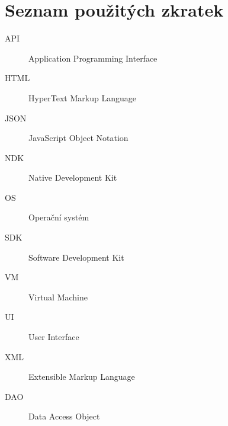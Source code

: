 \documentclass[thesis=B,czech]{FITthesis}[2013/10/20]
\begin{document}



\appendix

\chapter{Seznam použitých zkratek}
\begin{description}
	\item[API] Application Programming Interface
	\item[HTML] HyperText Markup Language
	\item[JSON] JavaScript Object Notation
	\item[NDK] Native Development Kit
	\item[OS] Operační systém
	\item[SDK] Software Development Kit
	\item[VM] Virtual Machine
	\item[UI] User Interface
	\item[XML] Extensible Markup Language
	\item[DAO] Data Access Object
\end{description}
\end{document}
